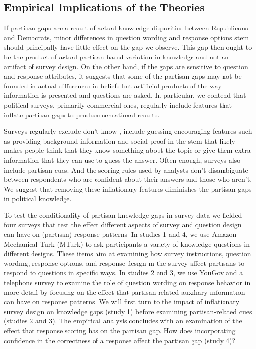 \documentclass[12pt, letterpaper]{article}
\begin{document}
	\subsection*{Empirical Implications of the Theories}
	
	If partisan gaps are a result of actual knowledge disparities between Republicans and Democrats, minor differences in question wording and response options stem should principally have little effect on the gap we observe. This gap then ought to be the product of actual partisan-based variation in knowledge and not an artifact of survey design. On the other hand, if the gaps are sensitive to question and response attributes, it suggests that some of the partisan gaps may not be founded in actual differences in beliefs but artificial products of the way information is presented and questions are asked. In particular, we contend that political surveys, primarily commercial ones, regularly include features that inflate partisan gaps to produce sensational results.
	
	Surveys regularly exclude don't know \citep{luskin2011don}, include guessing encouraging features such as providing background information and social proof in the stem that likely makes people think that they know something about the topic
	or give them extra information that they can use to guess the answer.
	Often enough, surveys also include partisan cues.
	And the scoring rules used by analysts don't disambiguate between respondents who are confident about their answers and those who aren't.
	We suggest that removing these inflationary features diminishes the partisan gaps in political knowledge.
	
	To test the conditionality of partisan knowledge gaps in survey data we fielded four surveys that test the effect different aspects of survey and question design can have on (partisan) response patterns. In studies 1 and 4, we use Amazon Mechanical Turk (MTurk) to ask participants a variety of knowledge questions in different designs. These items aim at examining how survey instructions, question wording, response options, and response design in the survey affect partisans to respond to questions in specific ways. In studies 2 and 3, we use YouGov and a telephone survey to examine the role of question wording on response behavior in more detail by focusing on the effect that partisan-related auxiliary information can have on response patterns. We will first turn to the impact of inflationary survey design on knowledge gaps (study 1) before examining partisan-related cues (studies 2 and 3). The empirical analysis concludes with an examination of the effect that response scoring has on the partisan gap. How does incorporating confidence in the correctness of a response affect the partisan gap (study 4)?
	
\end{document}

